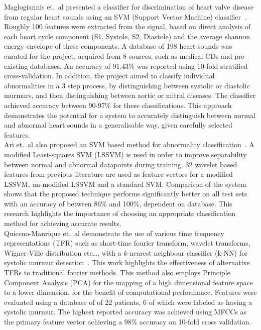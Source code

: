 \documentclass[titlepage, 12pt]{scrartcl} \usepackage{enumitem}
\begin{document}
Maglogiannis et.\ al presented a classifier for discrimination of heart valve
disease from regular heart sounds using an SVM (Support Vector Machine)
classifier~\parencite{Maglogiannis2009}.  Roughly 100 features were extracted
from the signal, based on direct analysis of each heart cycle component (S1,
Systole, S2, Diastole) and the average shannon energy envelope of these
components.  A database of 198 heart sounds was curated for the project,
acquired from 8 sources, such as medical CDs and pre-existing databases.  An
accuracy of 91.43\% was reported using 10-fold stratified cross-validation.  In
addition, the project aimed to classify individual abnormalities in a 3 step
process, by distinguishing between systolic or diastolic murmurs, and then
distinguishing between aortic or mitral diseases. The classifier achieved
accuracy between 90-97\% for these classifications. This approach demonstrates
the potential for a system to accurately distinguish between normal and
abnormal heart sounds in a generalisable way, given carefully selected
features.\\

Ari et.\ al also proposed an SVM based method for abnormality
classification~\parencite{Ari2010}. A modified Least-squares SVM (LSSVM) is
used in order to improve separability between normal and abnormal datapoints
during training. 32 wavelet based features from previous literature are used as
feature vectors for a modified LSSVM, un-modified LSSVM and a standard SVM.
Comparison of the system shows that the proposed technique performs
significantly better on all test sets with an accuracy of between 86\% and
100\%, dependent on database. This research highlights the importance of
choosing an appropriate classification method for achieving accurate results.\\

Quiceno-Manrique et.\ al demonstrate the use of various time frequency
representations (TFR) such as short-time fourier transform, wavelet transforms,
Wigner-Ville distribution etc\ldots, with a $k$-nearest neighbour classifier
(k-NN) for systolic murmur detection~\parencite{Quiceno-Manrique2010a}. This
work highlights the effectiveness of alternative TFRs to traditional fourier
methods. This method also employs Principle Component Analysis (PCA) for the
mapping of a high dimensional feature space to a lower dimension, for the
benefit of computational performance. Features were evaluated using a database
of of 22 patients, 6 of which were labeled as having a systolic murmur. The
highest reported accuracy was achieved using MFCCs as the primary feature
vector achieving a 98\% accuracy on 10-fold cross validation.\\
\end{document}
